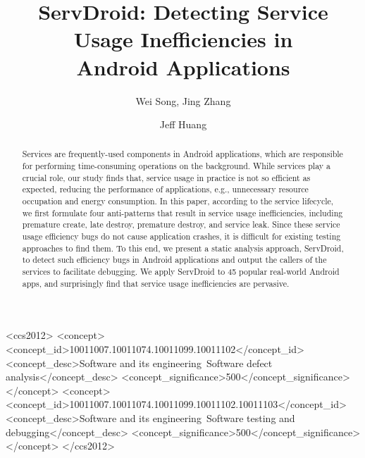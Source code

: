 \documentclass[sigconf,review, anonymous]{acmart}
\begin{document}
\title{ServDroid: Detecting Service Usage Inefficiencies in\\  Android Applications}

\author{Wei Song, Jing Zhang}

\author{Jeff Huang}

\renewcommand{\shortauthors}{}


\begin{abstract}
Services are frequently-used components in Android applications, which are responsible for performing time-consuming operations on the background. While services play a crucial role, our study finds that, service usage in practice is not so efficient as expected, reducing the performance of applications, e.g., unnecessary resource occupation and energy consumption. In this paper, according to the service lifecycle, we first formulate four anti-patterns that result in service usage inefficiencies, including premature create, late destroy, premature destroy, and service leak. Since these service usage efficiency bugs do not cause application crashes, it is difficult for existing testing approaches to find them. To this end, we present a static analysis approach, \textsf{ServDroid}, to detect such efficiency bugs in Android applications and output the callers of the services to facilitate debugging. We apply \textsf{ServDroid} to 45 popular real-world Android apps, and surprisingly find that service usage inefficiencies are pervasive.    
\end{abstract}

%
%
\begin{CCSXML}
<ccs2012>
<concept>
<concept_id>10011007.10011074.10011099.10011102</concept_id>
<concept_desc>Software and its engineering~Software defect analysis</concept_desc>
<concept_significance>500</concept_significance>
</concept>
<concept>
<concept_id>10011007.10011074.10011099.10011102.10011103</concept_id>
<concept_desc>Software and its engineering~Software testing and debugging</concept_desc>
<concept_significance>500</concept_significance>
</concept>
</ccs2012>
\end{CCSXML}
\end{document}
